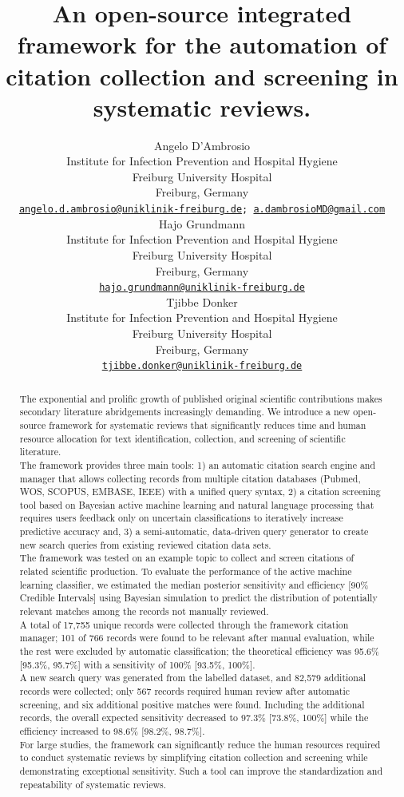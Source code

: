 \documentclass{article}
\title{An open-source integrated framework for the automation of
citation collection and screening in systematic reviews.}
\author{
    Angelo D'Ambrosio
   \\
    Institute for Infection Prevention and Hospital Hygiene \\
    Freiburg University Hospital \\
  Freiburg, Germany \\
  \texttt{\href{mailto:angelo.d.ambrosio@uniklinik-freiburg.de}{\nolinkurl{angelo.d.ambrosio@uniklinik-freiburg.de}};
\href{mailto:a.dambrosioMD@gmail.com}{\nolinkurl{a.dambrosioMD@gmail.com}}} \\
   \And
    Hajo Grundmann
   \\
    Institute for Infection Prevention and Hospital Hygiene \\
    Freiburg University Hospital \\
  Freiburg, Germany \\
  \texttt{\href{mailto:hajo.grundmann@uniklinik-freiburg.de}{\nolinkurl{hajo.grundmann@uniklinik-freiburg.de}}} \\
   \And
    Tjibbe Donker
   \\
    Institute for Infection Prevention and Hospital Hygiene \\
    Freiburg University Hospital \\
  Freiburg, Germany \\
  \texttt{\href{mailto:tjibbe.donker@uniklinik-freiburg.de}{\nolinkurl{tjibbe.donker@uniklinik-freiburg.de}}} \\
  }
\begin{document}
\maketitle


\begin{abstract}
The exponential and prolific growth of published original scientific
contributions makes secondary literature abridgements increasingly
demanding. We introduce a new open-source framework for systematic
reviews that significantly reduces time and human resource allocation
for text identification, collection, and screening of scientific
literature.\\
The framework provides three main tools: 1) an automatic citation search
engine and manager that allows collecting records from multiple citation
databases (Pubmed, WOS, SCOPUS, EMBASE, IEEE) with a unified query
syntax, 2) a citation screening tool based on Bayesian active machine
learning and natural language processing that requires users feedback
only on uncertain classifications to iteratively increase predictive
accuracy and, 3) a semi-automatic, data-driven query generator to create
new search queries from existing reviewed citation data sets.\\
The framework was tested on an example topic to collect and screen
citations of related scientific production. To evaluate the performance
of the active machine learning classifier, we estimated the median
posterior sensitivity and efficiency {[}90\% Credible Intervals{]} using
Bayesian simulation to predict the distribution of potentially relevant
matches among the records not manually reviewed.\\
A total of 17,755 unique records were collected through the framework
citation manager; 101 of 766 records were found to be relevant after
manual evaluation, while the rest were excluded by automatic
classification; the theoretical efficiency was 95.6\% {[}95.3\%,
95.7\%{]} with a sensitivity of 100\% {[}93.5\%, 100\%{]}.\\
A new search query was generated from the labelled dataset, and 82,579
additional records were collected; only 567 records required human
review after automatic screening, and six additional positive matches
were found. Including the additional records, the overall expected
sensitivity decreased to 97.3\% {[}73.8\%, 100\%{]} while the efficiency
increased to 98.6\% {[}98.2\%, 98.7\%{]}.\\
For large studies, the framework can significantly reduce the human
resources required to conduct systematic reviews by simplifying citation
collection and screening while demonstrating exceptional sensitivity.
Such a tool can improve the standardization and repeatability of
systematic reviews.
\end{abstract}
\end{document}
